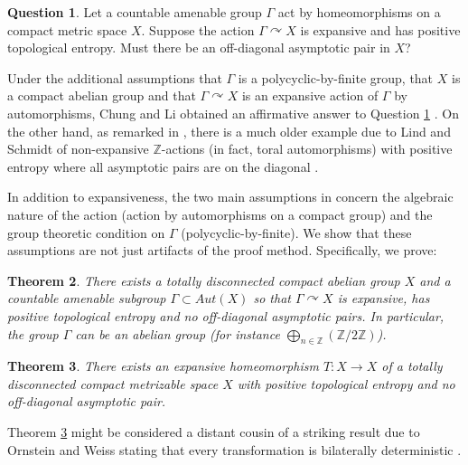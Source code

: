 \documentclass[oneside,english]{amsart}
\newtheorem{thm}{Theorem}[section]
\theoremstyle{definition}
\newtheorem{question}[thm]{Question}
\newcommand{\Aut}{\mathit{Aut}}
\newcommand{\act}[2]{{#1} \curvearrowright {#2}}
\begin{document}
\begin{question}\label{ques:Chung_Li} %
Let  a countable amenable group $\Gamma$  act by  homeomorphisms  on  a compact
metric space $X$. Suppose the action   $\act{\Gamma}{X}$ is expansive and has positive topological entropy.  Must there be an off-diagonal
asymptotic pair in $X$?
\end{question}
Under the additional assumptions that  $\Gamma$ is  a  polycyclic-by-finite group, that $X$ is a compact abelian  group and  that $\act{\Gamma}{X}$ is an expansive action of $\Gamma$  by automorphisms,  Chung and Li obtained an affirmative answer to Question \ref{ques:Chung_Li} \cite[Theorem $1.2$]{MR3314515}.
On the other hand, as remarked in \cite{MR3314515}, there is a much older example due to Lind and Schmidt    of non-expansive $\mathbb{Z}$-actions (in fact, toral automorphisms) with positive entropy where  all asymptotic pairs are on the diagonal \cite[Expample $3.4$]{MR1678035}.

In addition to expansiveness, the two main assumptions in \cite[Theorem $1.2$]{MR3314515} concern  the algebraic nature of the action (action by automorphisms on  a compact group) and the group theoretic condition on $\Gamma$ (polycyclic-by-finite).
We show that these assumptions are not just artifacts of the proof method. Specifically, we prove:

\begin{thm}\label{thm:alg_exp_pos_ent_no_asymp}
There exists a totally disconnected compact abelian group $X$ and a countable amenable subgroup  $\Gamma \subset \Aut(X)$ so that $\act{\Gamma}{X}$ is expansive, has positive topological entropy and no off-diagonal
asymptotic pairs. In particular,  the group $\Gamma$ can be an abelian group (for instance $\bigoplus_{n \in \mathbb{Z}}(\mathbb{Z}/2\mathbb{Z})$).
\end{thm}


\begin{thm}\label{thm:exapnsive_pos_entropy_no_asymp}
There exists an expansive homeomorphism $T:X \to X$ of a totally disconnected compact metrizable space $X$ with positive topological entropy and no off-diagonal
asymptotic pair.
\end{thm}
Theorem \ref{thm:exapnsive_pos_entropy_no_asymp} might be considered a distant cousin of a striking result due to Ornstein and Weiss  stating that every transformation is bilaterally deterministic \cite{MR0382600}.
\end{document}
